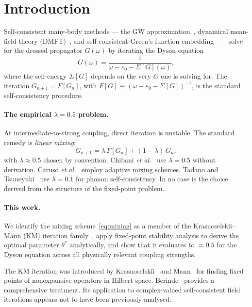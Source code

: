 \documentclass[aps,prb,twocolumn,superscriptaddress,nofootinbib,longbibliography,floatfix]{revtex4-2}
\newcommand{\optparam}{\theta^{*}}
\newcommand{\KM}{Krasnoselskii--Mann}
\theoremstyle{plain}
\theoremstyle{remark}
\begin{document}
\section{Introduction}
\label{sec:intro}

Self-consistent many-body methods — the GW
approximation~\cite{Hedin1965}, dynamical mean-field theory
(DMFT)~\cite{Georges1996}, and self-consistent Green's function
embedding~\cite{Chibani2016} — solve for the dressed propagator
$G(\omega)$ by iterating the Dyson equation
%
\begin{equation}
  G(\omega) = \frac{1}{\omega - \varepsilon_0 - \Sigma[G](\omega)},
  \label{eq:dyson}
\end{equation}
%
where the self-energy $\Sigma[G]$ depends on the very $G$ one is
solving for.  The iteration $G_{n+1} = F[G_n]$, with
$F[G] \equiv (\omega - \varepsilon_0 - \Sigma[G])^{-1}$, is the
standard self-consistency procedure.

\paragraph{The empirical $\lambda = 0.5$ problem.}
At intermediate-to-strong coupling, direct iteration is
unstable.  The standard remedy is \emph{linear mixing}:
%
\begin{equation}
  G_{n+1} = \lambda\, F[G_n] + (1-\lambda)\,G_n,
  \label{eq:mixing}
\end{equation}
%
with $\lambda \approx 0.5$ chosen by convention.
Chibani \textit{et al.}~\cite{Chibani2016} use $\lambda = 0.5$
without derivation.  Caruso \textit{et al.}~\cite{Caruso2013}
employ adaptive mixing schemes.  Tadano and
Tsuneyuki~\cite{Tadano2015} use $\lambda = 0.1$ for phonon
self-consistency.  In no case is the choice derived
from the structure of the fixed-point problem.

\paragraph{This work.}
We identify the mixing scheme~\eqref{eq:mixing} as a member of
the \KM{} (KM) iteration family~\cite{Krasnoselskii1955,Mann1953},
apply fixed-point stability analysis to derive the optimal
parameter $\optparam$ analytically, and show that it evaluates
to $\approx 0.5$ for the Dyson equation across all
physically relevant coupling strengths.

The KM iteration was introduced by
Krasnoselski\u{\i}~\cite{Krasnoselskii1955} and
Mann~\cite{Mann1953} for finding fixed points of nonexpansive
operators in Hilbert space.  Berinde~\cite{Berinde2007}
provides a comprehensive treatment.  Its application to
complex-valued self-consistent field iterations appears not
to have been previously analysed.
\end{document}
